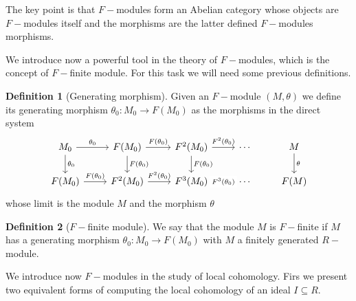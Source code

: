 \documentclass[leqno]{article}
\theoremstyle{definition}
\newtheorem{definition}{Definition}[section]
\begin{document}
The key point is that $F-$modules form an Abelian category whose objects are  $F-$modules itself and the morphisms are the latter defined  $F-$modules morphisms.

We introduce now a powerful tool in the theory of $F-$modules, which is the concept of  $F-$finite module. For this task we will need some previous definitions.

\begin{definition}[Generating morphism] Given an $F-$module  $(M, \theta )$ we define its generating morphism  $\theta_0 :M_0 \to F(M_0)$ as the morphisms in the direct system 
\[\begin{tikzcd}
	{M_0} & {F(M_0)} & {F^2(M_0)} & \cdots & M \\
	{F(M_0)} & {F^2(M_0)} & {F^3(M_0)} & \cdots & {F(M)}
	\arrow["{\theta_0}", from=1-1, to=1-2]
	\arrow["{F(\theta_0)}", from=2-1, to=2-2]
	\arrow["{F^2(\theta_0)}", from=2-2, to=2-3]
	\arrow["{F(\theta_0)}", from=1-2, to=1-3]
	\arrow["{\theta_0}", from=1-1, to=2-1]
	\arrow["{F(\theta_0)}", from=1-2, to=2-2]
	\arrow["{F(\theta_0)}", from=1-3, to=2-3]
	\arrow["{F^2(\theta_0)}", from=1-3, to=1-4]
	\arrow["{F^3(\theta_0)}"{description}, from=2-3, to=2-4]
	\arrow["\theta", from=1-5, to=2-5]
\end{tikzcd}\]
whose limit is the module $M$ and the morphism $\theta$ 
\end{definition}

\begin{definition}[$F-$finite module] We say that the module $M$ is  $F-$finite if  $M$ has a generating morphism  $\theta _0 : M_0 \to F(M_0)$ with $M$ a finitely generated  $R-$module.
\end{definition}







We introduce now  $F-$modules in the study of local cohomology. Firs we present two equivalent forms of computing the local cohomology of an ideal  $I\subseteq R$.
\end{document}
